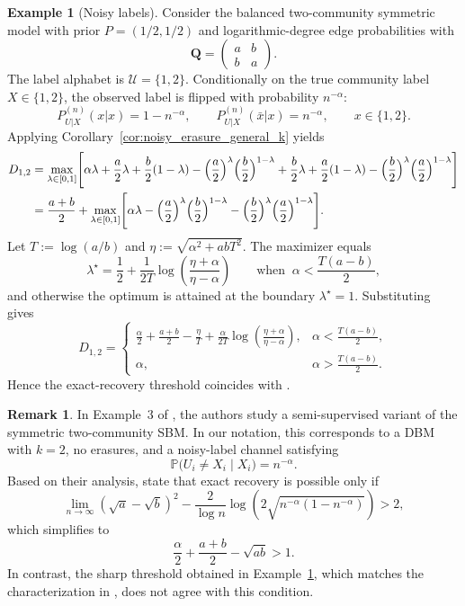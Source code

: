 \documentclass[11pt]{article}
\theoremstyle{plain}
\theoremstyle{definition}
\newtheorem{example}[theorem]{Example}
\newtheorem*{remark}{Remark}
\begin{document}
\begin{example}[Noisy labels]\label{eq:noisy_labels}
Consider the balanced two-community symmetric model with prior $P=(1/2,1/2)$ and logarithmic-degree edge probabilities with
\[
\mathbf{Q}=
\begin{pmatrix}
a & b\\
b & a
\end{pmatrix}.
\]
The label alphabet is $\mathcal{U}=\{1,2\}$. Conditionally on the true community label $X\in\{1,2\}$, the observed label is flipped with probability $n^{-\alpha}$:
\[
P_{U|X}^{(n)}(x|x)=1-n^{-\alpha},\qquad
P_{U|X}^{(n)}(\bar x|x)=n^{-\alpha},\qquad x\in\{1,2\}.
\]
Applying Corollary~\ref{cor:noisy_erasure_general_k} yields
\begin{align*}
D_{1,2}
&=\max_{\lambda\in[0,1]}
\Biggl[
\alpha\lambda
+\frac{a}{2}\lambda+\frac{b}{2}(1-\lambda)-\Bigl(\frac{a}{2}\Bigr)^\lambda\Bigl(\frac{b}{2}\Bigr)^{1-\lambda}
+\frac{b}{2}\lambda+\frac{a}{2}(1-\lambda)-\Bigl(\frac{b}{2}\Bigr)^\lambda\Bigl(\frac{a}{2}\Bigr)^{1-\lambda}
\Biggr]\\
&=\frac{a+b}{2}
+\max_{\lambda\in[0,1]}
\Biggl[
\alpha\lambda
-\Bigl(\frac{a}{2}\Bigr)^\lambda\Bigl(\frac{b}{2}\Bigr)^{1-\lambda}
-\Bigl(\frac{b}{2}\Bigr)^\lambda\Bigl(\frac{a}{2}\Bigr)^{1-\lambda}
\Biggr].
\end{align*}
Let $T:=\log(a/b)$ and $\eta:=\sqrt{\alpha^2+abT^2}$. The maximizer equals
\[
\lambda^\star=
\frac{1}{2}+\frac{1}{2T}\log\!\left(\frac{\eta+\alpha}{\eta-\alpha}\right)
\qquad\text{when }\ \alpha<\frac{T(a-b)}{2},
\]
and otherwise the optimum is attained at the boundary $\lambda^\star=1$. Substituting gives
\[
D_{1,2}=
\begin{cases}
\displaystyle
\frac{\alpha}{2}+\frac{a+b}{2}
-\frac{\eta}{T}
+\frac{\alpha}{2T}\log\!\left(\frac{\eta+\alpha}{\eta-\alpha}\right),
& \alpha<\frac{T(a-b)}{2},\\[1.2ex]
\displaystyle
\alpha,
& \alpha>\frac{T(a-b)}{2}.
\end{cases}
\]
Hence the exact-recovery threshold coincides with \citep{SN18}.
\end{example}



\begin{remark}
In Example~3 of \citep{dreveton2023exactAttributedSBM}, the authors study a semi-supervised variant of the symmetric two-community SBM. 
In our notation, this corresponds to a DBM with $k=2$, no erasures, and a noisy-label channel satisfying
\[
\mathbb{P}\bigl(U_i \neq X_i \mid X_i\bigr)=n^{-\alpha}.
\]
Based on their analysis, \cite{dreveton2023exactAttributedSBM} state that exact recovery is possible only if
\[
\lim_{n\to\infty}(\sqrt{a}-\sqrt{b})^2
-\frac{2}{\log n}\log\!\left(2\sqrt{n^{-\alpha}(1-n^{-\alpha})}\right) > 2,
\]
which simplifies to
\[
\frac{\alpha}{2}+\frac{a+b}{2}-\sqrt{ab} > 1.
\]
In contrast, the sharp threshold obtained in Example~\ref{eq:noisy_labels}, which matches the characterization in \citep{SN18}, 
does not agree with this condition. 
\end{remark}
\end{document}
